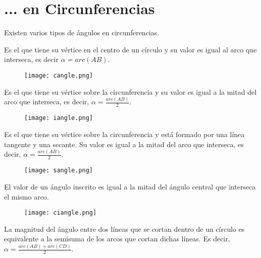 \section{... en Circunferencias}

Existen varios tipos de ángulos en circunferencias.

\begin{definition}
    Es el que tiene su vértice en el centro de un círculo y su 
    valor es igual al arco que interseca, es decir 
    $\alpha = arc(AB).$ 
\end{definition}

\begin{figure}[h]
    \centering
    \texttt{[image: cangle.png]}
\end{figure}

\begin{definition}
    Es el que tiene su vértice sobre la circunferencia y su valor 
    es igual a la mitad del arco que interseca, es decir, 
    $\alpha = \frac{arc(AB)}{2}.$
\end{definition}

\begin{figure}[h]
    \centering
    \texttt{[image: iangle.png]}
\end{figure}

\begin{definition}
    Es el que tiene su vértice sobre la circunferencia y está 
    formado por una línea tangente y una secante. Su valor es igual 
    a la mitad del arco que interseca, es decir, 
    $\alpha = \frac{arc(AB)}{2}.$
\end{definition}

\begin{figure}[h]
    \centering
    \texttt{[image: sangle.png]}
\end{figure}

\begin{theorem}
    El valor de un ángulo inscrito es igual a la mitad del ángulo 
    central que interseca el mismo arco.
\end{theorem}

\begin{figure}[h]
    \centering
    \texttt{[image: ciangle.png]}
\end{figure}

\begin{theorem}
    La magnitud del ángulo entre dos líneas que se cortan dentro
    de un círculo es equivalente a la semisuma de los arcos que 
    cortan dichas líneas. Es decir, 
    $\alpha = \frac{arc(AB)+arc(CD)}{2}.$
\end{theorem}

